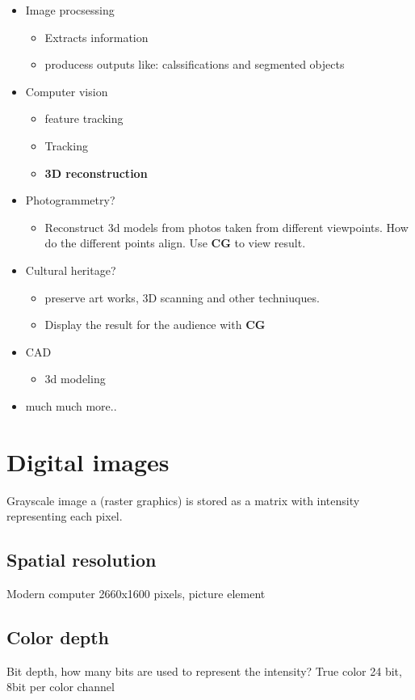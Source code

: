 \begin{itemize}
\begin{itemize}
	\end{itemize}
	\item Image procsessing
	\begin{itemize}
		\item Extracts information
		\item producess outputs like: calssifications and segmented objects
	\end{itemize}
	\item Computer vision
	\begin{itemize}
		\item feature tracking
		\item Tracking
		\item \textbf{3D reconstruction}
	\end{itemize}
	\item Photogrammetry?
	\begin{itemize}
		\item Reconstruct 3d models from photos taken from different viewpoints. How do the different points align. Use \textbf{CG} to view result. 
	\end{itemize}
	\item Cultural heritage?
	\begin{itemize}
		\item preserve art works, 3D scanning and other techniuques. 
		\item Display the result for the audience with \textbf{CG}
	\end{itemize}
	\item CAD
	\begin{itemize}
		\item 3d modeling
	\end{itemize}
	\item much much more..
\end{itemize}

\section{Digital images}
Grayscale image a (raster graphics) is stored as a matrix with intensity representing each pixel.

\subsection{Spatial resolution}
Modern computer 2660x1600 pixels, picture element


\subsection*{Color depth}
Bit depth, how many bits are used to represent the intensity?
True color 24 bit, 8bit per color channel


